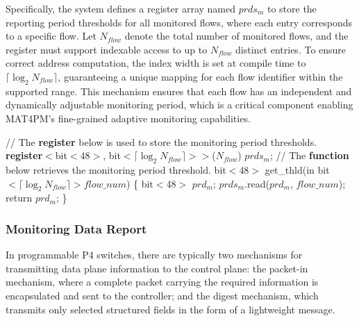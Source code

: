 Specifically, the system defines a register array named $prds_m$ to store the reporting period thresholds for all monitored flows, where each entry corresponds to a specific flow. 
Let $N_{flow}$ denote the total number of monitored flows, and the register must support indexable access to up to $N_{flow}$ distinct entries. 
To ensure correct address computation, the index width is set at compile time to $\lceil \log_2 N_{flow} \rceil$, guaranteeing a unique mapping for each flow identifier within the supported range. 
This mechanism ensures that each flow has an independent and dynamically adjustable monitoring period, which is a critical component enabling MAT4PM's fine-grained adaptive monitoring capabilities.

\begin{algorithm}[!t]
    \caption{Monitoring threshold configuration and retrieval}
    \label{algo_thld}
    \begin{algorithmic}[1]
        \STATE // The \textbf{register} below is used to store the monitoring period thresholds.
        \STATE \textbf{register}$<$bit$<$48$>$, bit$<\lceil \log_2 N_{flow} \rceil>>$($N_{flow}$) $prds_m$;
        \STATE
        \STATE // The \textbf{function} below retrieves the monitoring period threshold.
        \STATE bit$<$48$>$ get\_thld(in bit$<\lceil \log_2 N_{flow} \rceil> flow\_num$) \{
        \STATE \hspace{1em} bit$<$48$>$ $prd_m$;
        \STATE \hspace{1em} $prds_m$.read($prd_m$, $flow\_num$);
        \STATE \hspace{1em} return $prd_m$;
        \STATE \}
    \end{algorithmic}
\end{algorithm}

\subsubsection{Monitoring Data Report}

In programmable P4 switches, there are typically two mechanisms for transmitting data plane information to the control plane: the packet-in mechanism, where a complete packet carrying the required information is encapsulated and sent to the controller; and the digest mechanism, which transmits only selected structured fields in the form of a lightweight message. 

